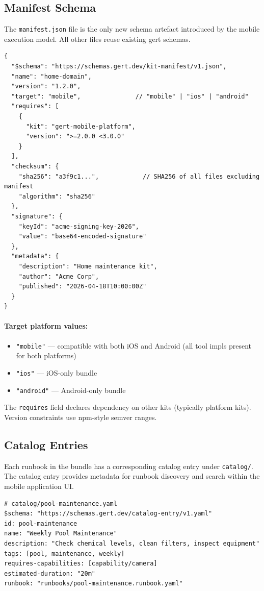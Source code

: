 \subsection{Manifest Schema}

The \texttt{manifest.json} file is the only new schema artefact introduced by the mobile execution model. All other files reuse existing gert schemas.

\begin{verbatim}
{
  "$schema": "https://schemas.gert.dev/kit-manifest/v1.json",
  "name": "home-domain",
  "version": "1.2.0",
  "target": "mobile",               // "mobile" | "ios" | "android"
  "requires": [
    {
      "kit": "gert-mobile-platform",
      "version": ">=2.0.0 <3.0.0"
    }
  ],
  "checksum": {
    "sha256": "a3f9c1...",            // SHA256 of all files excluding manifest
    "algorithm": "sha256"
  },
  "signature": {
    "keyId": "acme-signing-key-2026",
    "value": "base64-encoded-signature"
  },
  "metadata": {
    "description": "Home maintenance kit",
    "author": "Acme Corp",
    "published": "2026-04-18T10:00:00Z"
  }
}
\end{verbatim}

\paragraph{Target platform values:}

\begin{itemize}
  \item \texttt{"mobile"} — compatible with both iOS and Android (all tool impls present for both platforms)
  \item \texttt{"ios"} — iOS-only bundle
  \item \texttt{"android"} — Android-only bundle
\end{itemize}

The \texttt{requires} field declares dependency on other kits (typically platform kits). Version constraints use npm-style semver ranges.

\subsection{Catalog Entries}

Each runbook in the bundle has a corresponding catalog entry under \texttt{catalog/}. The catalog entry provides metadata for runbook discovery and search within the mobile application UI.

\begin{verbatim}
# catalog/pool-maintenance.yaml
$schema: "https://schemas.gert.dev/catalog-entry/v1.yaml"
id: pool-maintenance
name: "Weekly Pool Maintenance"
description: "Check chemical levels, clean filters, inspect equipment"
tags: [pool, maintenance, weekly]
requires-capabilities: [capability/camera]
estimated-duration: "20m"
runbook: "runbooks/pool-maintenance.runbook.yaml"
\end{verbatim}

